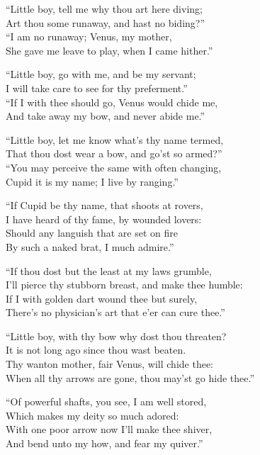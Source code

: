 \settowidth{\versewidth}{“Little boy, tell me why thou art here diving;}
\begin{dcverse}\footnotesizerr
“Little boy, tell me why thou art here diving;\\
Art thou some runaway, and hast no biding?”\\
“I am no runaway; Venus, my mother,\\
She gave me leave to play, when I came hither.”

“Little boy, go with me, and be my servant;\\
I will take care to see for thy preferment.” \\
“If I with thee should go, Venus would chide me,\\
And take away my bow, and never abide me.”

“Little boy, let me know what’s thy name termed,\\
That thou dost wear a bow, and go’st so armed?”\\
“You may perceive the same with often changing,\\
Cupid it is my name; I live by ranging.”

“If Cupid be thy name, that shoots at rovers,\\
I have heard of thy fame, by wounded lovers:\\
Should any languish that are set on fire\\
By such a naked brat, I much admire.”

“If thou dost but the least at my laws grumble,\\
I’ll pierce thy stubborn breast, and make thee humble:\\
If I with golden dart wound thee but surely,\\
There’s no physician’s art that e’er can cure thee.”

“Little boy, with thy bow why dost thou threaten?\\
It is not long ago since thou wast beaten.\\
Thy wanton mother, fair Venus, will chide thee:\\
When all thy arrows are gone, thou may’st go hide thee.”

“Of powerful shafts, you see, I am well stored,\\
Which makes my deity so much adored:\\
With one poor arrow now I’ll make thee shiver,\\
And bend unto my how, and fear my quiver.”
\end{dcverse}

